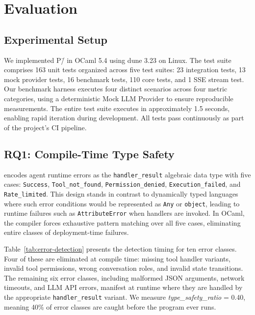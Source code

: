 \section{Evaluation}
\label{sec:evaluation}

\subsection{Experimental Setup}
\label{sec:eval:setup}

We implemented P\=/\PAR{} in OCaml 5.4 using dune 3.23 on Linux. The test suite comprises 163 unit tests organized across five test suites: 23 integration tests, 13 mock provider tests, 16 benchmark tests, 110 core tests, and 1 SSE stream test. Our benchmark harness executes four distinct scenarios across four metric categories, using a deterministic Mock LLM Provider to ensure reproducible measurements. The entire test suite executes in approximately 1.5 seconds, enabling rapid iteration during development. All tests pass continuously as part of the project's CI pipeline.

\subsection{RQ1: Compile-Time Type Safety}
\label{sec:eval:type-safety}

\PARNAME{} encodes agent runtime errors as the \identifiable{} \texttt{handler\_result} algebraic data type with five cases: \texttt{Success}, \texttt{Tool\_not\_found}, \texttt{Permission\_denied}, \texttt{Execution\_failed}, and \texttt{Rate\_limited}. This design stands in contrast to dynamically typed languages where such error conditions would be represented as \texttt{Any} or \texttt{object}, leading to runtime failures such as \texttt{AttributeError} when handlers are invoked. In OCaml, the compiler forces exhaustive pattern matching over all five cases, eliminating entire classes of deployment-time failures.

Table~\ref{tab:error-detection} presents the detection timing for ten error classes. Four of these are eliminated at compile time: missing tool handler variants, invalid tool permissions, wrong conversation roles, and invalid state transitions. The remaining six error classes, including malformed JSON arguments, network timeouts, and LLM API errors, manifest at runtime where they are handled by the appropriate \texttt{handler\_result} variant. We measure \emph{type\_safety\_ratio} = 0.40, meaning 40\% of error classes are caught before the program ever runs.

